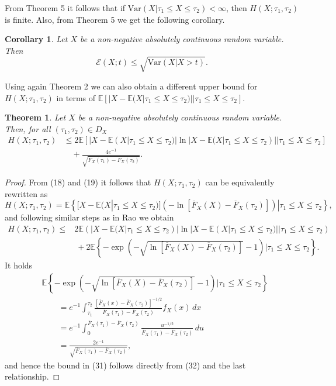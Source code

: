 \documentclass[11pt]{article}
\newtheorem{theorem}{Theorem}
\newtheorem{corollary}{Corollary}
\begin{document}
From Theorem 5 it follows that if $\mathrm{Var}(X|\tau_1 \leq X\leq \tau_2)<\infty$, then $H(X;\tau_1,\tau_2 )$ is finite. Also, from Theorem 5 we get the following corollary.

 
\begin{corollary}
	Let $X$ be a non-negative absolutely continuous random variable. Then
	$$ \textstyle \mathcal{E}(X;t)\leq\sqrt{\mathrm{Var}(X|X>t)}. $$
\end{corollary}

Using again Theorem 2 we can also obtain a different upper bound for $H(X;\tau_1,\tau_2 )$ in terms of $\mathbb{E}[|X-\mathbb{E}(X|\tau_1 \leq X\leq \tau_2 )||\tau_1 \leq X\leq \tau_2 ]$.

 
\begin{theorem}
	Let $X$ be a non-negative absolutely continuous random variable. Then, for all $(\tau_1,\tau_2)\in D_X$
	\begin{align}
		H(X;\tau_1,\tau_2 ) & \textstyle \leq 2\mathbb{E}[|X-\mathbb{E}(X|\tau_1 \leq X\leq \tau_2 )|\ln|X-\mathbb{E}(X|\tau_1 \leq X\leq \tau_2 )||\tau_1 \leq X\leq \tau_2 ] \nonumber \\
		& \textstyle \quad + \frac{4e^{-1}}{\sqrt{\overline{F}_X (\tau_1 )-\overline{F}_X (\tau_2)}}.
	\end{align}
\end{theorem}

\begin{proof}
	From (18) and (19) it follows that $H(X;\tau_1,\tau_2 )$ can be equivalently rewritten as
	$$ \textstyle H(X;\tau_1,\tau_2 ) = \mathbb{E}\left\{[X-\mathbb{E}(X|\tau_1 \leq X\leq \tau_2 )](-\ln[\overline{F}_X (X)-\overline{F}_X (\tau_2)])|\tau_1 \leq X\leq \tau_2 \right\}, $$
	and following similar steps as in Rao \cite[Section 6]{Rao2005} we obtain
	\begin{align}
		H(X;\tau_1,\tau_2 ) \leq & \textstyle 2\mathbb{E}(|X-\mathbb{E}(X|\tau_1 \leq X\leq \tau_2 )|\ln|X-\mathbb{E}(X|\tau_1 \leq X\leq \tau_2 )||\tau_1 \leq X\leq \tau_2 ) \nonumber \\
		& \textstyle \ + 2\mathbb{E}\left\{-\exp\left(-\sqrt{\ln[\overline{F}_X (X)-\overline{F}_X (\tau_2)]}-1\right)|\tau_1 \leq X\leq \tau_2 \right\}.
	\end{align}
	It holds
	\begin{align*}
		& \textstyle \mathbb{E}\left\{-\exp\left(-\sqrt{\ln[\overline{F}_X (X)-\overline{F}_X (\tau_2)]}-1\right)|\tau_1 \leq X\leq \tau_2 \right\} \\
		& \textstyle \qquad = e^{-1} \int_{\tau_1}^{\tau_2} \frac{[\overline{F}_X (x)-\overline{F}_X (\tau_2 )]^{-1/2}}{\overline{F}_X (\tau_1 )-\overline{F}_X (\tau_2)} f_X (x)\,dx \\
		& \textstyle \qquad = e^{-1} \int_0^{\overline{F}_X (\tau_1 )-\overline{F}_X (\tau_2)} \frac{u^{-1/2}}{\overline{F}_X (\tau_1 )-\overline{F}_X (\tau_2)}\,du \\
		& \textstyle \qquad = \frac{2e^{-1}}{\sqrt{\overline{F}_X (\tau_1 )-\overline{F}_X (\tau_2)}},
	\end{align*}
	and hence the bound in (31) follows directly from (32) and the last relationship.
\end{proof}
\end{document}

